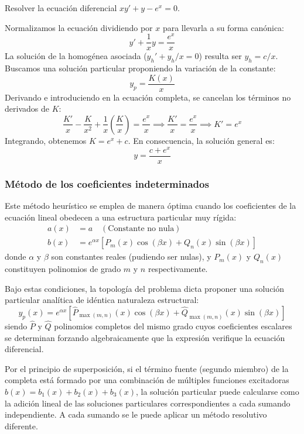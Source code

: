 \begin{ejercicio}
Resolver la ecuación diferencial $xy' + y - e^x = 0$.
\end{ejercicio}

\begin{tcolorbox}
Normalizamos la ecuación dividiendo por $x$ para llevarla a su forma canónica:
$$ y' + \frac{1}{x}y = \frac{e^x}{x} $$
La solución de la homogénea asociada ($y_h' + y_h/x = 0$) resulta ser $y_h = c/x$. 
Buscamos una solución particular proponiendo la variación de la constante:
$$ y_p = \frac{K(x)}{x} $$
Derivando e introduciendo en la ecuación completa, se cancelan los términos no derivados de $K$:
$$ \frac{K'}{x} - \frac{K}{x^2} + \frac{1}{x}\left(\frac{K}{x}\right) = \frac{e^x}{x} \implies \frac{K'}{x} = \frac{e^x}{x} \implies K' = e^x $$
Integrando, obtenemos $K = e^x + c$. En consecuencia, la solución general es:
$$ y = \frac{c + e^x}{x} $$
\end{tcolorbox}

\subsubsection{Método de los coeficientes indeterminados}

Este método heurístico se emplea de manera óptima cuando los coeficientes de la ecuación lineal obedecen a una estructura particular muy rígida:
\begin{align*}
    a(x) &= a \quad (\text{Constante no nula}) \\
    b(x) &= e^{\alpha x} [P_m(x)\cos(\beta x) + Q_n(x)\sin(\beta x)]
\end{align*}
donde $\alpha$ y $\beta$ son constantes reales (pudiendo ser nulas), y $P_m(x)$ y $Q_n(x)$ constituyen polinomios de grado $m$ y $n$ respectivamente.

Bajo estas condiciones, la topología del problema dicta proponer una solución particular analítica de idéntica naturaleza estructural:
$$ y_p(x) = e^{\alpha x} [\hat{P}_{\max(m,n)}(x)\cos(\beta x) + \hat{Q}_{\max(m,n)}(x)\sin(\beta x)] $$
siendo $\hat{P}$ y $\hat{Q}$ polinomios completos del mismo grado cuyos coeficientes escalares se determinan forzando algebraicamente que la expresión verifique la ecuación diferencial.

\begin{observacion}
Por el principio de superposición, si el término fuente (segundo miembro) de la completa está formado por una combinación de múltiples funciones excitadoras $b(x) = b_1(x) + b_2(x) + b_3(x)$, la solución particular puede calcularse como la adición lineal de las soluciones particulares correspondientes a cada sumando independiente. A cada sumando se le puede aplicar un método resolutivo diferente.
\end{observacion}

